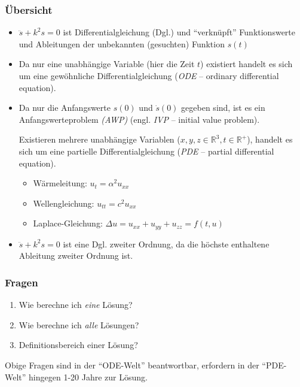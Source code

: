 
\subsubsection*{Übersicht}

\begin{itemize}
	\item $\ddot s + k^2s = 0$ ist Differentialgleichung (Dgl.) und "`verknüpft"' Funktionswerte und Ableitungen der unbekannten (gesuchten) Funktion $s(t)$
	\item Da nur eine unabhängige Variable (hier die Zeit $t$) existiert handelt es sich um eine gewöhnliche Differentialgleichung (\emph{ODE} -- ordinary differential equation).
	\item Da nur die Anfangswerte $s(0)$ und $\dot s(0)$ gegeben sind, ist es ein Anfangswerteproblem \emph{(AWP)} (engl. \emph{IVP} -- initial value problem).
	\begin{note}
		Existieren mehrere unabhängige Variablen ($x, y, z \in \mathbb{R}^3, t \in \mathbb{R}^+$), handelt es sich um eine partielle Differentialgleichung (\emph{PDE} -- partial differential equation).
	\end{note}
	\begin{example}
		\begin{itemize}
			\item Wärmeleitung: $u_t = \alpha^2 u_{xx}$
			\item Wellengleichung: $u_{tt} = c^2 u_{xx}$
			\item Laplace-Gleichung: $\Delta u = u_{xx} + u_{yy} + u_{zz} = f(t, u)$
		\end{itemize}
	\end{example}
	\item $\ddot s + k^2s = 0$ ist eine Dgl. zweiter Ordnung, da die höchste enthaltene Ableitung zweiter Ordnung ist.
\end{itemize}

\subsubsection*{Fragen}
\begin{enumerate}
	\item Wie berechne ich \emph{eine} Lösung?
	\item Wie berechne ich \emph{alle} Lösungen?
	\item Definitionsbereich einer Lösung?
\end{enumerate}
Obige Fragen sind in der "`ODE-Welt"' beantwortbar, erfordern in der "`PDE-Welt"' hingegen 1-20 Jahre zur Lösung.

